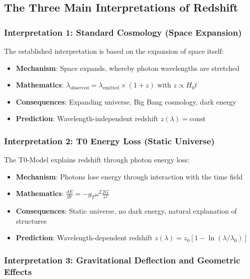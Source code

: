 \documentclass[12pt,a4paper]{report}
\begin{document}
\subsection{The Three Main Interpretations of Redshift}

\subsubsection{Interpretation 1: Standard Cosmology (Space Expansion)}

The established interpretation is based on the expansion of space itself:

\begin{itemize}
	\item \textbf{Mechanism}: Space expands, whereby photon wavelengths are stretched
	\item \textbf{Mathematics}: $\lambda_{\text{observed}} = \lambda_{\text{emitted}} \times (1 + z)$ with $z \propto H_0 t$
	\item \textbf{Consequences}: Expanding universe, Big Bang cosmology, dark energy
	\item \textbf{Prediction}: Wavelength-independent redshift $z(\lambda) = \text{const}$
\end{itemize}

\subsubsection{Interpretation 2: T0 Energy Loss (Static Universe)}

The T0-Model explains redshift through photon energy loss:

\begin{itemize}
	\item \textbf{Mechanism}: Photons lose energy through interaction with the time field
	\item \textbf{Mathematics}: $\frac{dE}{dr} = -g_T \omega^2 \frac{2G}{r^2}$
	\item \textbf{Consequences}: Static universe, no dark energy, natural explanation of structures
	\item \textbf{Prediction}: Wavelength-dependent redshift $z(\lambda) = z_0[1 - \ln(\lambda/\lambda_0)]$
\end{itemize}

\subsubsection{Interpretation 3: Gravitational Deflection and Geometric Effects}
\end{document}
